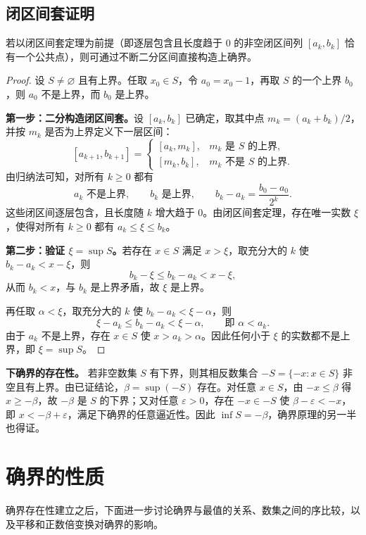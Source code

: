 \documentclass[UTF8, fontset=fandol, a4paper, 12pt]{ctexart}
\theoremstyle{definition}
\begin{document}
\subsection{闭区间套证明}
\noindent 若以闭区间套定理为前提（即逐层包含且长度趋于 $0$ 的非空闭区间列 $[a_k,b_k]$ 恰有一个公共点），则可通过不断二分区间直接构造上确界。

\begin{proof}
设 $S\ne\varnothing$ 且有上界。任取 $x_0\in S$，令 $a_0=x_0-1$，再取 $S$ 的一个上界 $b_0$，则 $a_0$ 不是上界，而 $b_0$ 是上界。

\textbf{第一步：二分构造闭区间套。}设 $[a_k,b_k]$ 已确定，取其中点 $m_k=(a_k+b_k)/2$，并按 $m_k$ 是否为上界定义下一层区间：
\[
  [a_{k+1},b_{k+1}]=
  \begin{cases}
    [a_k,m_k],&m_k\text{ 是 }S\text{ 的上界},\\
    [m_k,b_k],&m_k\text{ 不是 }S\text{ 的上界}.
  \end{cases}
\]
由归纳法可知，对所有 $k\ge0$ 都有
\[
  a_k\text{ 不是上界},\qquad b_k\text{ 是上界},\qquad
  b_k-a_k=\frac{b_0-a_0}{2^k}.
\]
这些闭区间逐层包含，且长度随 $k$ 增大趋于 $0$。由闭区间套定理，存在唯一实数 $\xi$，使得对所有 $k\ge0$ 都有 $a_k\le\xi\le b_k$。

\medskip
\textbf{第二步：验证 $\xi=\sup S$。}若存在 $x\in S$ 满足 $x>\xi$，取充分大的 $k$ 使 $b_k-a_k<x-\xi$，则
\[
  b_k-\xi\le b_k-a_k<x-\xi,
\]
从而 $b_k<x$，与 $b_k$ 是上界矛盾，故 $\xi$ 是上界。

再任取 $\alpha<\xi$，取充分大的 $k$ 使 $b_k-a_k<\xi-\alpha$，则
\[
  \xi-a_k\le b_k-a_k<\xi-\alpha,
  \qquad \text{即 }\alpha<a_k.
\]
由于 $a_k$ 不是上界，存在 $x\in S$ 使 $x>a_k>\alpha$。因此任何小于 $\xi$ 的实数都不是上界，即 $\xi=\sup S$。
\end{proof}

\medskip
\noindent\textbf{下确界的存在性。}
若非空数集 $S$ 有下界，则其相反数集合 $-S=\{-x:x\in S\}$ 非空且有上界。由已证结论，$\beta=\sup(-S)$ 存在。对任意 $x\in S$，由 $-x\le\beta$ 得 $x\ge-\beta$，故 $-\beta$ 是 $S$ 的下界；又对任意 $\varepsilon>0$，存在 $-x\in-S$ 使 $\beta-\varepsilon<-x$，即 $x<-\beta+\varepsilon$，满足下确界的任意逼近性。因此 $\inf S=-\beta$，确界原理的另一半也得证。

\section{确界的性质}
确界存在性建立之后，下面进一步讨论确界与最值的关系、数集之间的序比较，以及平移和正数倍变换对确界的影响。
\end{document}
